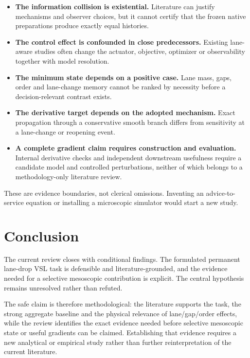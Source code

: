 \documentclass[10pt]{article}
\newcommand{\key}[1]{\textbf{\color{navy}#1}}
\begin{document}
\begin{itemize}
\item \key{The information collision is existential.} Literature can justify
      mechanisms and observer choices, but it cannot certify that the frozen
      native preparations produce exactly equal histories.
\item \key{The control effect is confounded in close predecessors.} Existing
      lane-aware studies often change the actuator, objective, optimizer or
      observability together with model resolution.
\item \key{The minimum state depends on a positive case.} Lane mass, gaps, order
      and lane-change memory cannot be ranked by necessity before a
      decision-relevant contrast exists.
\item \key{The derivative target depends on the adopted mechanism.} Exact
      propagation through a conservative smooth branch differs from sensitivity
      at a lane-change or reopening event.
\item \key{A complete gradient claim requires construction and evaluation.}
      Internal derivative checks and independent downstream usefulness require a
      candidate model and controlled perturbations, neither of which belongs to
      a methodology-only literature review.
\end{itemize}

These are evidence boundaries, not clerical omissions. Inventing an advice-to-
service equation or installing a microscopic simulator would start a new study.

\section{Conclusion}

The current review closes with conditional findings. The formulated permanent
lane-drop VSL task is defensible and literature-grounded, and the evidence needed
for a selective mesoscopic contribution is explicit. The central hypothesis
remains unresolved rather than refuted.

The safe claim is therefore methodological: the literature supports the task,
the strong aggregate baseline and the physical relevance of lane/gap/order
effects, while the review identifies the exact evidence needed before selective
mesoscopic state or useful gradients can be claimed. Establishing that evidence
requires a new analytical or empirical study rather than further reinterpretation
of the current literature.
\end{document}
